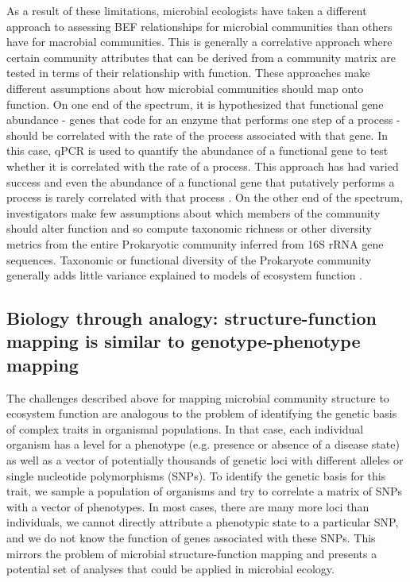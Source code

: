 \documentclass{article}
\begin{document}
As a result of these limitations, microbial ecologists have taken a different
approach to assessing BEF relationships for microbial communities than others
have for macrobial communities. This is generally a correlative approach where
certain community attributes that can be derived from a community matrix are
tested in terms of their relationship with function. These approaches make
different assumptions about how microbial communities should map onto function.
On one end of the spectrum, it is hypothesized that functional gene abundance - genes that
code for an enzyme that performs one step of a process - should be correlated
with the rate of the process associated with that gene. In this case, qPCR
is used to quantify the abundance of a functional gene to test whether it is
correlated with the rate of a process. This approach has had varied success and even the abundance of a
functional gene that putatively performs a process is rarely correlated with
that process \citep{rocca2015}. On the other end of the
spectrum, investigators make few assumptions about which members of the community should
alter function and so compute
taxonomic richness or other diversity metrics from the entire Prokaryotic
community inferred from 16S rRNA gene sequences. Taxonomic or functional
diversity of the Prokaryote community generally adds little variance explained
to models of ecosystem function \citep{graham2016}.

\subsection{Biology through analogy: structure-function mapping is similar
to genotype-phenotype mapping}

The challenges described above for mapping microbial community structure to
ecosystem function are analogous to the problem of identifying the
genetic basis of complex traits in organismal populations. In that case,
each individual organism has a level for a phenotype (e.g. presence
or absence of a disease state) as well as a vector of potentially
thousands of genetic loci with different alleles or single nucleotide
polymorphisms (SNPs). To identify the genetic basis for this trait, we sample
a population of organisms and try to correlate a matrix of SNPs with a
vector of phenotypes. In most cases, there are many more loci than
individuals, we cannot directly attribute a phenotypic state to a particular
SNP, and we do not know the function of genes associated with these
SNPs. This mirrors the problem of microbial structure-function mapping
and presents a potential set of analyses that could be applied in
microbial ecology.
\end{document}
